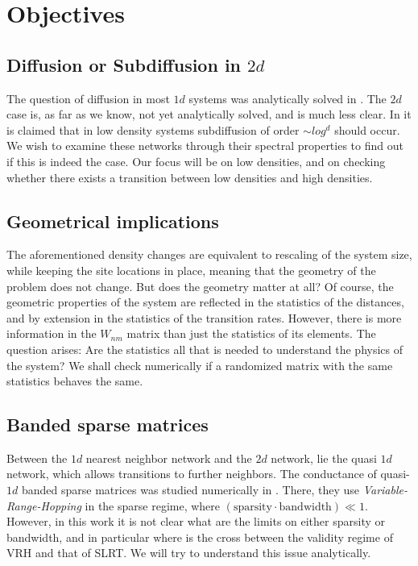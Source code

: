 \chapter{Objectives}

\section{Diffusion or Subdiffusion in $2d$}

The question of diffusion in most $1d$ systems was analytically solved in \cite{alexander_excitation_1981}. 
The $2d$ case is, as far as we know, not yet analytically solved, and is much less clear. 
In \cite{amir_localization_2010} it is claimed that in low density systems subdiffusion of
order $\sim log^d$ should occur. We wish to examine these networks through their spectral
properties to find out if this is indeed the case. Our focus will be on low densities,
and on checking whether there exists a transition between low densities and high densities.


\section{Geometrical implications}

The aforementioned density changes are equivalent to rescaling of the system size,
while keeping the site locations in place, meaning that the geometry of the problem 
does not change. But does the geometry matter at all? Of course, the geometric properties
of the system are reflected in the statistics of the distances,
and by extension in the statistics of the transition rates. 
However, there is more information in the $W_{nm}$ matrix than just the statistics of its elements.
The question arises: Are the statistics all that is needed to understand the physics of the system? 
We shall check numerically if a randomized matrix with the same statistics behaves the same.



\section{Banded sparse matrices}

Between the $1d$ nearest neighbor network and the $2d$ network,
lie the quasi $1d$ network, which allows transitions to further neighbors.
The conductance of quasi-$1d$ banded sparse matrices was studied numerically in \cite{stotland_random-matrix_2010}. There, they use \emph{Variable-Range-Hopping} in the sparse regime, where 
$(\text{sparsity}\cdot \text{bandwidth}) \ll 1$. 
However, in this work it is not clear what are the limits on either sparsity or bandwidth, and in particular where is the cross between the validity regime of VRH and that of SLRT. We will try to understand this issue analytically.


